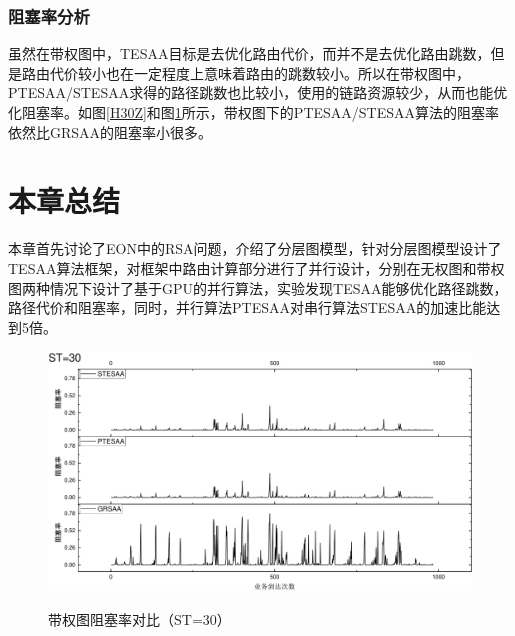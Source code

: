 \subsubsection{阻塞率分析}
虽然在带权图中，TESAA目标是去优化路由代价，而并不是去优化路由跳数，但是路由代价较小也在一定程度上意味着路由的跳数较小。所以在带权图中，PTESAA/STESAA求得的路径跳数也比较小，使用的链路资源较少，从而也能优化阻塞率。如图\ref{H30Z}和图\ref{H40Z}所示，带权图下的PTESAA/STESAA算法的阻塞率依然比GRSAA的阻塞率小很多。



\section{本章总结}
本章首先讨论了EON中的RSA问题，介绍了分层图模型，针对分层图模型设计了TESAA算法框架，对框架中路由计算部分进行了并行设计，分别在无权图和带权图两种情况下设计了基于GPU的并行算法，实验发现TESAA能够优化路径跳数，路径代价和阻塞率，同时，并行算法PTESAA对串行算法STESAA的加速比能达到5倍。
\begin{figure}
\setlength{\abovecaptionskip}{-0.5cm}
\begin{center}
{\includegraphics[width=0.8 \textwidth]{figures/H30Z.pdf}}
\end{center}
\caption{{\footnotesize{带权图阻塞率对比（ST=30）}}}
\label{H40Z}
\end{figure}